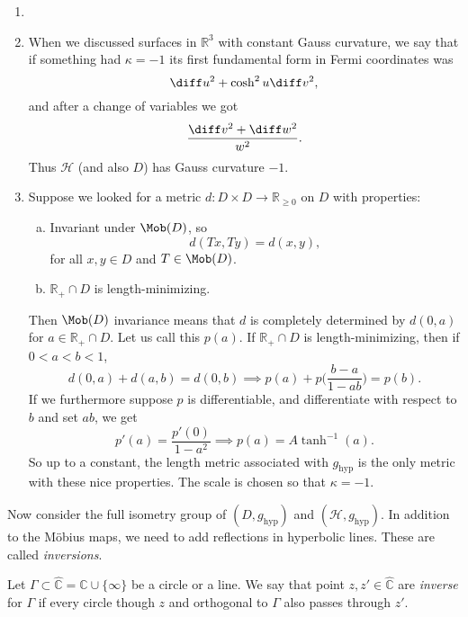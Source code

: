 \documentclass[12pt]{article}
\begin{document}
\begin{remark}
	\begin{enumerate}
		\item[]
		\item When we discussed surfaces in $\mathbb{R}^3$ with constant Gauss curvature, we say that if something had $\kappa = -1$ its first fundamental form in Fermi coordinates was
			\[
			\diff u^2 + \cosh^2 u \diff v^2,
			\]
			and after a change of variables we got
			\[
			\frac{\diff v^2 + \diff w^2}{w^2}.
			\]
			Thus $\mathcal{H}$ (and also $D$) has Gauss curvature $-1$.
		\item Suppose we looked for a metric $d : D \times D \to \mathbb{R}_{\ge 0}$ on $D$ with properties:
			\begin{enumerate}[(a)]
				\item Invariant under $\Mob(D)$, so
					\[
					d(Tx, Ty) = d(x, y),
					\]
					for all $x, y \in D$ and $T \in \Mob(D)$.
				\item $\mathbb{R}_+ \cap D$ is length-minimizing.
			\end{enumerate}
			Then $\Mob(D)$ invariance means that $d$ is completely determined by $d(0,a)$ for $a \in \mathbb{R}_+ \cap D$. Let us call this $p(a)$. If $\mathbb{R}_+ \cap D$ is length-minimizing, then if $0 < a < b < 1$,
			\[
			d(0, a) + d(a, b) = d(0, b) \implies p(a) + p\biggl( \frac{b-a}{1 - ab} \biggr) = p(b).
			\]
			If we furthermore suppose $p$ is differentiable, and differentiate with respect to $b$ and set $a b$, we get
			\[
			p'(a) = \frac{p'(0)}{1 - a^2} \implies p(a) = A \tanh^{-1}(a).
			\]
			So up to a constant, the length metric associated with $g_\mathrm{hyp}$ is the only metric with these nice properties. The scale is chosen so that $\kappa = -1$.
	\end{enumerate}
\end{remark}

Now consider the full isometry group of $(D, g_\mathrm{hyp})$ and $(\mathcal{H}, g_\mathrm{hyp})$. In addition to the M\"{o}bius maps, we need to add reflections in hyperbolic lines. These are called \emph{inversions}.

\begin{definition}
	Let $\Gamma \subset \hat{\mathbb{C}} = \mathbb{C} \cup \{\infty\}$ be a circle or a line. We say that point $z, z' \in \hat{\mathbb{C}}$ are \emph{inverse} for $\Gamma$ if every circle though $z$ and orthogonal to $\Gamma$ also passes through $z'$.
\end{definition}
\end{document}
